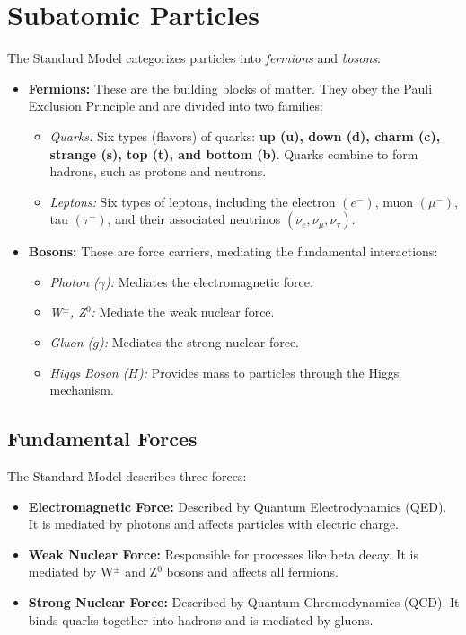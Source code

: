 \section{Subatomic Particles}
The Standard Model categorizes particles into \textit{fermions} and \textit{bosons}:
\begin{itemize}
    \item \textbf{Fermions:} These are the building blocks of matter. They obey the Pauli Exclusion Principle and are divided into two families:
    \begin{itemize}
        \item \textit{Quarks:} Six types (flavors) of quarks: \textbf{up (u), down (d), charm (c), strange (s), top (t), and bottom (b)}. Quarks combine to form hadrons, such as protons and neutrons.
        \item \textit{Leptons:} Six types of leptons, including the electron $(e^-)$, muon $(\mu^-)$, tau $(\tau^-)$, and their associated neutrinos $(\nu_e, \nu_\mu, \nu_\tau)$.
    \end{itemize}
    \item \textbf{Bosons:} These are force carriers, mediating the fundamental interactions:
    \begin{itemize}
        \item \textit{Photon ($\gamma$):} Mediates the electromagnetic force.
        \item \textit{W$^\pm$, Z$^0$:} Mediate the weak nuclear force.
        \item \textit{Gluon ($g$):} Mediates the strong nuclear force.
        \item \textit{Higgs Boson ($H$):} Provides mass to particles through the Higgs mechanism.
    \end{itemize}
\end{itemize}

\subsection{Fundamental Forces}
The Standard Model describes three forces:
\begin{itemize}
    \item \textbf{Electromagnetic Force:} Described by Quantum Electrodynamics (QED). It is mediated by photons and affects particles with electric charge.
    \item \textbf{Weak Nuclear Force:} Responsible for processes like beta decay. It is mediated by W$^\pm$ and Z$^0$ bosons and affects all fermions.
    \item \textbf{Strong Nuclear Force:} Described by Quantum Chromodynamics (QCD). It binds quarks together into hadrons and is mediated by gluons.
\end{itemize}

